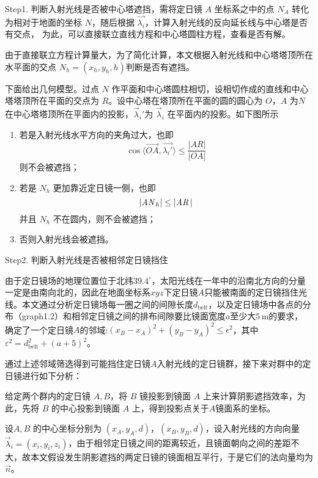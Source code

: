 \documentclass[../main.tex]{subfiles}
\begin{document}
Step1. 判断入射光线是否被中心塔遮挡，需将定日镜 \(A\) 坐标系之中的点 \(N_{A}\) 转化为相对于地面的坐标 \(N\)，随后根据 \(\vec {\lambda _{i}}\)，计算入射光线的反向延长线与中心塔是否有交点，
为此，可以直接联立直线方程和中心塔圆柱方程，查看是否有解。

由于直接联立方程计算量大，为了简化计算，本文根据入射光线和中心塔塔顶所在水平面的交点 \(N_{h} = (x _{h} , y_{h}, h)\)判断是否有遮挡。

下面给出几何模型。过点 \(N\) 作平面和中心塔圆柱相切，设相切作成的直线和中心塔塔顶所在平面的交点为 \(R\)。设中心塔在塔顶所在平面的圆的圆心为 \(O\)，\(A\) 为\(N\)在中心塔塔顶所在平面内的投影，\(\vec \lambda _{i} '\)为 \(\vec \lambda _{i}\) 在平面内的投影。如下图所示

\begin{enumerate}
\item 若是入射光线水平方向的夹角过大，也即
\begin{equation}
\cos \langle \overrightarrow {OA}, \vec {\lambda _{i} '} \rangle \le \frac{\vert AR \vert }{\vert OA \vert }
\end{equation}
则不会被遮挡；
\item 若是 \(N_{h}\) 更加靠近定日镜一侧，也即
\begin{equation}
\vert {\it A N}_{h}\vert \le \vert {\it AR\,} \vert
\end{equation}并且 \(N_{h}\) 不在圆内，则不会被遮挡；
\item 否则入射光线会被遮挡。
\end{enumerate}

Step2. 判断入射光线是否被相邻定日镜挡住

由于定日镜场的地理位置位于北纬\(39.4^{\circ}\)，太阳光线在一年中的沿南北方向的分量一定是由南向北的，因此在地面坐标系\(xyz\)下定日镜\(A\)只能被南面的定日镜挡住光线。本文通过分析定日镜场每一圈之间的间隙长度\(d_{\mathrm{belt}}\)，以及定日镜场中各点的分布（graph1.2）和相邻定日镜之间的排布间隙要比镜面宽度\(a\)至少大\(5 \, \mathrm{m}\)的要求，
确定了一个定日镜\(A\)的邻域:\((x_B - x_A)^2 + (y_B - y_A)^2 \le \epsilon^2\)，其中\(\varepsilon^2=d_{\mathrm{belt}}^2+(a+5)^2\)。

通过上述邻域筛选得到可能挡住定日镜\(A\)入射光线的定日镜群，接下来对群中的定日镜进行如下分析：

给定两个群内的定日镜 \(A, B\)，将 \(B\) 镜投影到镜面 \(A\) 上来计算阴影遮挡效率，为此，先将 \(B\) 的中心投影到镜面 \(A\) 上，得到投影点关于\(A\)镜面系的坐标。

设\(A,B\) 的中心坐标分别为 \((x_{A}, y_{A}, d)\)，\((x_{B}, y_{B}, d)\)，设入射光线的方向向量 \(\vec \lambda _{i} = (x_{i}, y_{i}, z_{i})\)，由于相邻定日镜之间的距离较近，且镜面朝向之间的差距不大，故本文假设发生阴影遮挡的两定日镜的镜面相互平行，于是它们的法向量均为 \(\vec n\)。
\end{document}

